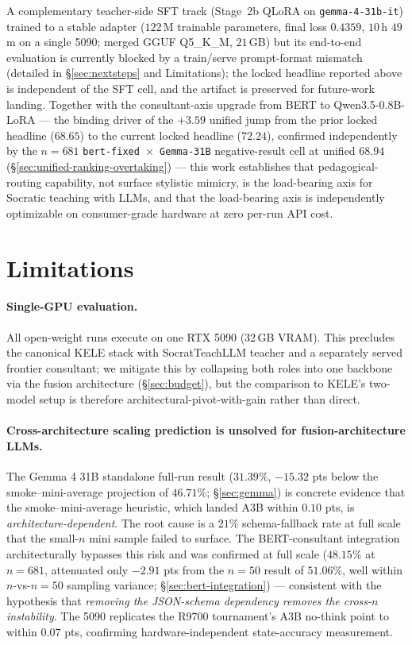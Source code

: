 \documentclass[11pt]{article}
\begin{document}
A complementary teacher-side SFT track (Stage~2b QLoRA on \texttt{gemma-4-31b-it}) trained to a stable adapter ($122$\,M trainable parameters, final loss $0.4359$, $10$\,h $49$\,m on a single 5090; merged GGUF Q5\_K\_M, $21$\,GB) but its end-to-end evaluation is currently blocked by a train/serve prompt-format mismatch (detailed in \S\ref{sec:nextsteps} and Limitations); the locked headline reported above is independent of the SFT cell, and the artifact is preserved for future-work landing. Together with the consultant-axis upgrade from BERT to Qwen3.5-0.8B-LoRA --- the binding driver of the $+3.59$ unified jump from the prior locked headline ($68.65$) to the current locked headline ($72.24$), confirmed independently by the $n{=}681$ \texttt{bert-fixed $\times$ Gemma-31B} negative-result cell at unified $68.94$ (\S\ref{sec:unified-ranking-overtaking}) --- this work establishes that pedagogical-routing capability, not surface stylistic mimicry, is the load-bearing axis for Socratic teaching with LLMs, and that the load-bearing axis is independently optimizable on consumer-grade hardware at zero per-run API cost.

\section*{Limitations}

\paragraph{Single-GPU evaluation.} All open-weight runs execute on one RTX 5090 (32\,GB VRAM). This precludes the canonical KELE stack with SocratTeachLLM teacher and a separately served frontier consultant; we mitigate this by collapsing both roles into one backbone via the fusion architecture (\S\ref{sec:budget}), but the comparison to KELE's two-model setup is therefore architectural-pivot-with-gain rather than direct.

\paragraph{Cross-architecture scaling prediction is unsolved for fusion-architecture LLMs.} The Gemma 4 31B standalone full-run result ($31.39\%$, $-15.32$ pts below the smoke--mini-average projection of $46.71\%$; \S\ref{sec:gemma}) is concrete evidence that the smoke--mini-average heuristic, which landed A3B within $0.10$ pts, is \emph{architecture-dependent}. The root cause is a $21\%$ schema-fallback rate at full scale that the small-$n$ mini sample failed to surface. The BERT-consultant integration architecturally bypasses this risk and was confirmed at full scale ($48.15\%$ at $n{=}681$, attenuated only $-2.91$ pts from the $n{=}50$ result of $51.06\%$, well within $n$-vs-$n{=}50$ sampling variance; \S\ref{sec:bert-integration}) --- consistent with the hypothesis that \emph{removing the JSON-schema dependency removes the cross-$n$ instability}. The 5090 replicates the R9700 tournament's A3B no-think point to within $0.07$ pts, confirming hardware-independent state-accuracy measurement.
\end{document}
